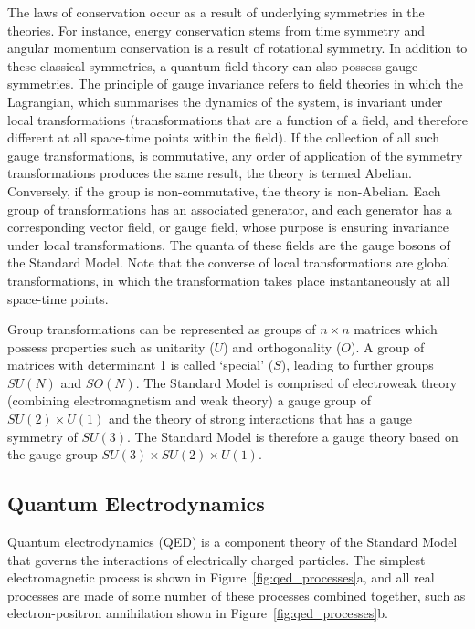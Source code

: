 The laws of conservation occur as a result of underlying symmetries in the theories. For instance, energy
conservation stems from time symmetry and angular momentum conservation is a result of rotational symmetry.
In addition to these classical symmetries, a quantum field theory can also possess gauge symmetries. The
principle of gauge invariance refers to field theories in which the Lagrangian, which summarises the dynamics
of the system, is invariant under local transformations (transformations that are a function of a field, and
therefore different at all space-time points within the field). %
If the collection of all such gauge transformations, is commutative, \ie any order of application of the
symmetry transformations produces the same result, the theory is termed Abelian. Conversely, if the group is
non-commutative, the theory is non-Abelian. Each group of transformations has an associated generator, and
each generator has a corresponding vector field, or gauge field, whose purpose is ensuring invariance under
local transformations. The quanta of these fields are the gauge bosons of the Standard Model. Note that the
converse of local transformations are global transformations, in which the transformation takes place
instantaneously at all space-time points.

Group transformations can be represented as groups of $n \times n$ matrices which possess properties such as
unitarity ($U$) and orthogonality ($O$). A group of matrices with determinant 1 is called `special' ($S$),
leading to further groups $SU(N)$ and $SO(N)$. The Standard Model is comprised of electroweak theory
(combining electromagnetism and weak theory) a gauge group of $SU(2) \times U(1)$ and the theory of strong
interactions that has a gauge symmetry of $SU(3)$. The Standard Model is therefore a gauge theory based on the
gauge group $SU(3) \times SU(2) \times U(1)$.

\subsection{Quantum Electrodynamics}
\label{ss:quantum_electrodynamics}

Quantum electrodynamics (QED) is a component theory of the Standard Model that governs the interactions of
electrically charged particles. The simplest electromagnetic process is shown in
Figure~\ref{fig:qed_processes}a, and all real processes are made of some number of these processes combined
together, such as electron-positron annihilation shown in Figure~\ref{fig:qed_processes}b.

